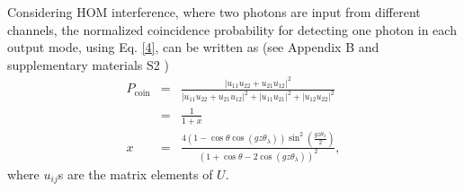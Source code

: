 \documentclass[%
reprint,
superscriptaddress,
amsthm,amsmath,amssymb,
aps,
]{revtex4-1}
\begin{document}
Considering HOM interference, where two photons are input from different channels, the normalized coincidence probability for detecting one photon in each output mode, using Eq. \ref{4}, can be written as (see Appendix B and supplementary materials S2 \cite{SupplementalMaterial})
\begin{eqnarray}
	P_{\text{coin}}&=&\frac{\left| u_{11} u_{22} + u_{21} u_{12} \right|^2}{
		\left| u_{11} u_{22} + u_{21} u_{12} \right|^2
		+ \left| u_{11} u_{21} \right|^2
		+ \left| u_{12} u_{22} \right|^2}\nonumber\\
    &=&\frac{1}{1+x} \nonumber\\
    x&=&\frac{4 \left( 1 - \cos \theta \cos(gz \theta_{\lambda}) \right) \sin^2 \left( \frac{gz \theta_{\lambda}}{2} \right)}{\left( 1 + \cos \theta - 2 \cos(gz \theta_{\lambda}) \right)^2}\label{9},
\end{eqnarray}
where $ u_{ij} $s are the matrix elements of $U$.
\\
\hfill
\end{document}
